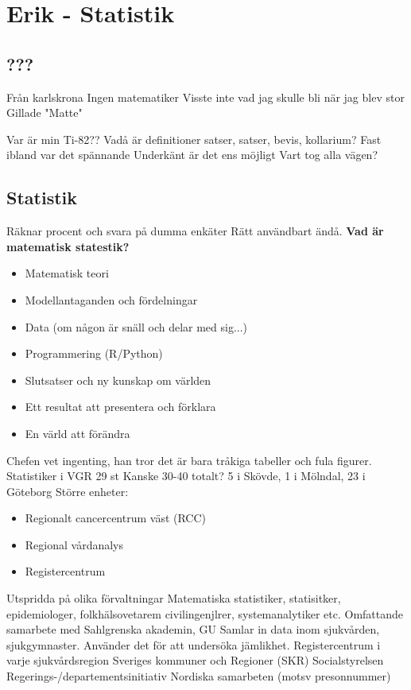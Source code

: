 \chapter{Erik - Statistik}

\section{???}
Från karlskrona
Ingen matematiker
Visste inte vad jag skulle bli när jag blev stor
Gillade "Matte"

Var är min Ti-82??
Vadå är definitioner satser, satser, bevis, kollarium?
Fast ibland var det spännande
Underkänt är det ens möjligt
Vart tog alla vägen?

\section{Statistik}
Räknar procent och svara på dumma enkäter
Rätt användbart ändå.
\textbf{Vad är matematisk statestik?}
\begin{itemize}
	\item Matematisk teori
	\item Modellantaganden och fördelningar
	\item Data (om någon är snäll och delar med sig...)
	\item Programmering (R/Python)
	\item Slutsatser och ny kunskap om världen
	\item Ett resultat att presentera och förklara
	\item En värld att förändra
\end{itemize}

Chefen vet ingenting, han tror det är bara tråkiga tabeller och fula figurer.
Statistiker i VGR
29 st
Kanske 30-40 totalt?
5 i Skövde, 1 i Mölndal, 23 i Göteborg
Större enheter:
\begin{itemize}
\item Regionalt cancercentrum väst (RCC)
\item Regional vårdanalys
\item Registercentrum	
\end{itemize}

Utspridda på olika förvaltningar
Matematiska statistiker, statisitker, epidemiologer, folkhälsovetarem civilingenjlrer, systemanalytiker etc.
Omfattande samarbete med Sahlgrenska akademin, GU
Samlar in data inom sjukvården, sjukgymnaster.
Använder det för att undersöka jämlikhet.
Registercentrum i varje sjukvårdsregion
Sveriges kommuner och Regioner (SKR)
Socialstyrelsen
Regerings-/departementsinitiativ
Nordiska samarbeten (motsv presonnummer)
